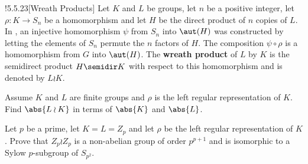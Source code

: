 \begin{exercise}!{5.5.23}[Wreath Products]
    Let $K$ and $L$ be groups, let $n$ be a positive integer, let $\rho \colon K \to S_n$ be a homomorphism and let $H$ be the direct product of $n$ copies of $L$.
	In , an injective homomorphism $\psi$ from $S_n$ into $\aut(H)$ was constructed by letting the elements of $S_n$ permute the $n$ factors of $H$.
	The composition $\psi \circ \rho$ is a homomorphism from $G$ into $\aut(H)$.
	The \textbf{wreath product} of $L$ by $K$ is the semidirect product $H \semidir K$ with respect to this homomorphism and is denoted by $L \wr K$.
    
    \begin{subexercises}
        \item Assume $K$ and $L$ are finite groups and $\rho$ is the left regular representation of $K$.
	    Find $\abs{L \wr K}$ in terms of $\abs{K}$ and $\abs{L}$.
        \item Let $p$ be a prime, let $K = L = Z_p$ and let $\rho$ be the left regular representation of $K$.
	    Prove that $Z_p \wr Z_p$ is a non-abelian group of order $p^{p+1}$ and is isomorphic to a Sylow $p$-subgroup of $S_{p^2}$.
        
    \end{subexercises}
\end{exercise}

